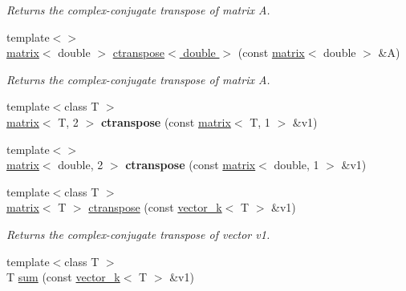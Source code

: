 \begin{DoxyCompactItemize}
\begin{DoxyCompactList}\small\item\em Returns the complex-\/conjugate transpose of matrix A. \end{DoxyCompactList}\item 
\hypertarget{namespacekeycpp_a9fc1e2c9bf6ee79ee28a6f25b7b55b23}{{\footnotesize template$<$$>$ }\\\hyperlink{classkeycpp_1_1matrix}{matrix}$<$ double $>$ \hyperlink{namespacekeycpp_a9fc1e2c9bf6ee79ee28a6f25b7b55b23}{ctranspose$<$ double $>$} (const \hyperlink{classkeycpp_1_1matrix}{matrix}$<$ double $>$ \&A)}\label{namespacekeycpp_a9fc1e2c9bf6ee79ee28a6f25b7b55b23}

\begin{DoxyCompactList}\small\item\em Returns the complex-\/conjugate transpose of matrix A. \end{DoxyCompactList}\item 
\hypertarget{namespacekeycpp_a21722a52fe60726dbeaff3ee47787d2a}{{\footnotesize template$<$class T $>$ }\\\hyperlink{classkeycpp_1_1matrix}{matrix}$<$ T, 2 $>$ {\bfseries ctranspose} (const \hyperlink{classkeycpp_1_1matrix}{matrix}$<$ T, 1 $>$ \&v1)}\label{namespacekeycpp_a21722a52fe60726dbeaff3ee47787d2a}

\item 
\hypertarget{namespacekeycpp_ab3d20ed431cc6169d23b932a2ed57a35}{{\footnotesize template$<$$>$ }\\\hyperlink{classkeycpp_1_1matrix}{matrix}$<$ double, 2 $>$ {\bfseries ctranspose} (const \hyperlink{classkeycpp_1_1matrix}{matrix}$<$ double, 1 $>$ \&v1)}\label{namespacekeycpp_ab3d20ed431cc6169d23b932a2ed57a35}

\item 
\hypertarget{namespacekeycpp_a60ac98094acdd80972dfd34d307489dd}{{\footnotesize template$<$class T $>$ }\\\hyperlink{classkeycpp_1_1matrix}{matrix}$<$ T $>$ \hyperlink{namespacekeycpp_a60ac98094acdd80972dfd34d307489dd}{ctranspose} (const \hyperlink{classkeycpp_1_1vector__k}{vector\-\_\-k}$<$ T $>$ \&v1)}\label{namespacekeycpp_a60ac98094acdd80972dfd34d307489dd}

\begin{DoxyCompactList}\small\item\em Returns the complex-\/conjugate transpose of vector v1. \end{DoxyCompactList}\item 
\hypertarget{namespacekeycpp_a7d3157bfc97800f25010c32280dde212}{{\footnotesize template$<$class T $>$ }\\T \hyperlink{namespacekeycpp_a7d3157bfc97800f25010c32280dde212}{sum} (const \hyperlink{classkeycpp_1_1vector__k}{vector\-\_\-k}$<$ T $>$ \&v1)}\label{namespacekeycpp_a7d3157bfc97800f25010c32280dde212}


\end{DoxyCompactItemize}
